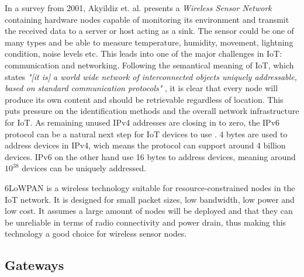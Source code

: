 In a survey from 2001, Akyildiz et. al.  \cite{akyildiz2002wireless} presents a
\textit{Wireless Sensor Network} containing hardware nodes capable of
monitoring its environment and transmit the received data to a server or host
acting as a sink. The sensor could be one of many types and be able to measure
temperature, humidity, movement, lightning condition, noise levels etc. This
leads into one of the major challenges in IoT: communication and networking.
Following the semantical meaning of IoT, which states \textit{"[it is] a world
wide network of interconnected objects uniquely addressable, based on standard
communication protocols"} \cite{bassi2008internet}, it is clear that every node
will produce its own content and should be retrievable regardless of location.
This puts pressure on the identification methods and the overall network
infrastructure for IoT. As remaining unused IPv4 addresses are closing in to
zero, the IPv6 protocol can be a natural next step for IoT devices to use
\cite{atzori2010internet}. 4 bytes are used to address devices in IPv4, wich
means the protocol can support around 4 billion devices. IPv6 on the other hand
use 16 bytes to address devices, meaning around $10^{38}$ devices can be
uniquely addressed.

6LoWPAN is a wireless technology suitable for resource-constrained nodes in the
IoT network. It is designed for small packet sizes, low bandwidth, low power
and low cost. It assumes a large amount of nodes will be deployed and that they
can be unreliable in terms of radio connectivity and power drain, thus making
this technology a good choice for wireless sensor nodes. \cite{kushalnagar2007ipv6}


\subsection{Gateways}

